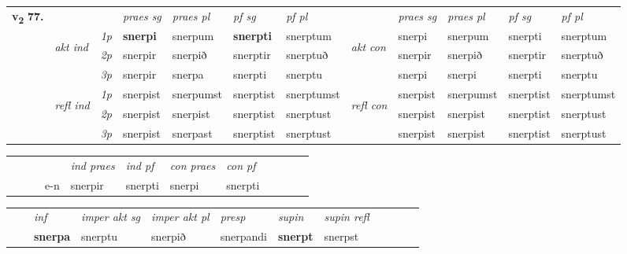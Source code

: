 \begin{tabular}{llllllllllll} \toprule
\multirow{4}{*}{{{\textbf{v{\textsubscript{2}}} \Large{\textbf{77.}}}}}  & &   &  \textit{praes sg}  & \textit{praes pl}  &\textit{ pf sg} & \textit{pf pl} &  &  \textit{praes sg}  & \textit{praes pl}  & \textit{pf sg} & \textit{pf pl } \\*
	\cmidrule{4-7} \cmidrule{9-12}
 & \multirow{3}{*}{\begin{turn}{90}\textit{akt ind}\end{turn}} & {\textit{1p}} & \textbf{snerpi} & snerpum    & \textbf{snerpti} & snerptum & \multirow{3}{*}{\begin{turn}{90}\textit{akt con}\end{turn}} &snerpi & snerpum & snerpti & snerptum\\*
& &  {\textit{2p}} &  snerpir  & snerpið   & snerptir & snerptuð & & snerpir & snerpið & snerptir & snerptuð \\*
& &  {\textit{3p}} & snerpir & snerpa   & snerpti & snerptu & & snerpi & snerpi& snerpti & snerptu  \\*
\cmidrule{4-7} \cmidrule{9-12}
 &\multirow{3}{*}{\begin{turn}{90}\textit{refl ind}\end{turn}} & {\textit{1p}} & snerpist & snerpumst    & snerptist & snerptumst & \multirow{3}{*}{\begin{turn}{90}\textit{refl con}\end{turn}}  &snerpist & snerpumst & snerptist & snerptumst\\*
 &&  {\textit{2p}} &  snerpist  & snerpist   & snerptist & snerptust & &snerpist & snerpist & snerptist & snerptust \\*
& &  {\textit{3p}} & snerpist & snerpast   & snerptist & snerptust & & snerpist & snerpist& snerptist & snerptust  \\*
\cmidrule{4-7} \cmidrule{9-12}
\end{tabular}


\begin{tabular}{llllllllllll}
 & &  & &  \textit{ind praes} & \textit{ind pf} & \textit{con praes} & \textit{con pf} \\*
&  & & e-n & snerpir & snerpti & snerpi & snerpti \\*
\cmidrule{5-9}
\end{tabular}


\begin{tabular}{llllllllllll}
 & & \textit{inf} & \textit{imper akt sg} & \textit{imper akt pl}   & \textit{presp} & \textit{supin} & \textit{supin refl}      \\*
  & & \textbf{snerpa} & snerptu  & snerpið   & snerpandi &  \textbf{snerpt} & snerpst  \\*
\cmidrule{1-12}
\end{tabular}



